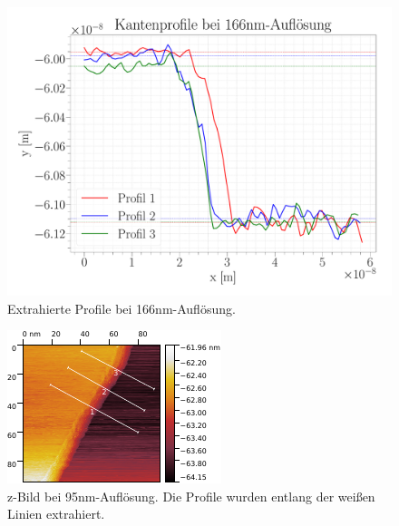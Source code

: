 \begin{figure}[H]
\centering
\includegraphics[width=\textwidth]{../Figures/166nm_profiles.pdf}
\caption{Extrahierte Profile bei {166}{nm}-Auflösung.}
\label{166nmProfiles}
\end{figure}

\begin{figure}[H]
\centering
\includegraphics[width=\textwidth]{../Gwyddion/HOPG/95nm.pdf}
\caption{z-Bild bei {95}{nm}-Auflösung. Die Profile wurden entlang der weißen Linien extrahiert.}
\label{95nm}
\end{figure}

